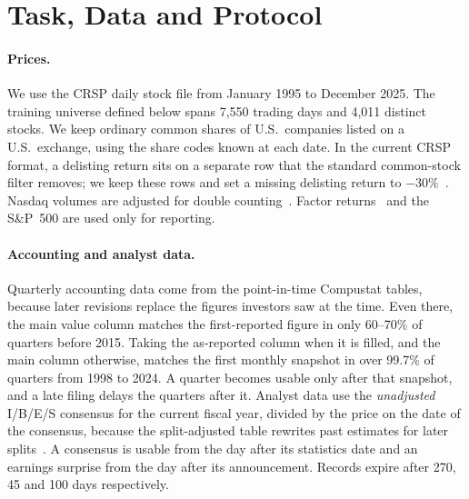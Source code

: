 \section{Task, Data and Protocol}
\label{sec:setup}

\paragraph{Prices.}
We use the CRSP daily stock file from January 1995 to December 2025.
The training universe defined below spans 7,550 trading days and 4,011 distinct stocks.
We keep ordinary common shares of U.S.\ companies listed on a U.S.\ exchange, using the share codes known at each date.
In the current CRSP format, a delisting return sits on a separate row that the standard common-stock filter removes; we keep these rows and set a missing delisting return to $-30\%$~\cite{shumway1997delisting}.
Nasdaq volumes are adjusted for double counting~\cite{gao2010marketing}.
Factor returns~\cite{fama2015five,carhart1997persistence} and the S\&P~500 are used only for reporting.

\paragraph{Accounting and analyst data.}
Quarterly accounting data come from the point-in-time Compustat tables, because later revisions replace the figures investors saw at the time.
Even there, the main value column matches the first-reported figure in only 60--70\% of quarters before 2015.
Taking the as-reported column when it is filled, and the main column otherwise, matches the first monthly snapshot in over 99.7\% of quarters from 1998 to 2024.
A quarter becomes usable only after that snapshot, and a late filing delays the quarters after it.
Analyst data use the \emph{unadjusted} I/B/E/S consensus for the current fiscal year, divided by the price on the date of the consensus, because the split-adjusted table rewrites past estimates for later splits~\cite{payne2003ibes}.
A consensus is usable from the day after its statistics date and an earnings surprise from the day after its announcement.
Records expire after 270, 45 and 100 days respectively.

